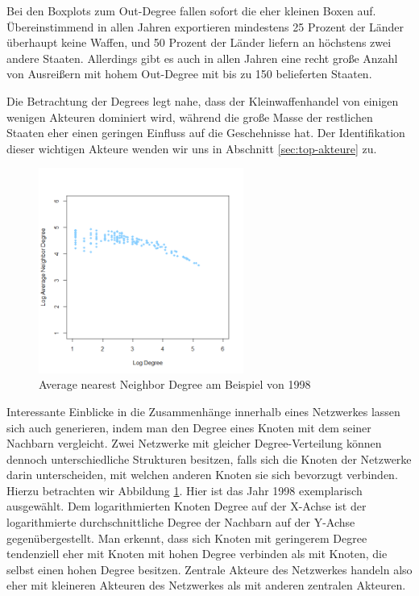 \documentclass[a4paper,ngerman,oneside,titlepage,bibliography=totoc,11pt]{scrreprt}
\begin{document}
Bei den Boxplots zum Out-Degree fallen sofort die eher kleinen Boxen auf. Übereinstimmend in allen Jahren exportieren mindestens 25 Prozent der Länder überhaupt keine Waffen, und 50 Prozent der Länder liefern an höchstens zwei andere Staaten. Allerdings gibt es auch in allen Jahren eine recht große Anzahl von Ausreißern mit hohem Out-Degree mit bis zu 150 belieferten Staaten. 

Die Betrachtung der Degrees legt nahe, dass der Kleinwaffenhandel von einigen wenigen Akteuren dominiert wird, während die große Masse der restlichen Staaten eher einen geringen Einfluss auf die Geschehnisse hat. Der Identifikation dieser wichtigen Akteure wenden wir uns in Abschnitt \ref{sec:top-akteure} zu.


\begin{figure}[htbp]
	\centering
		\includegraphics[width=0.60\textwidth]{Grafiken/and.png}
	\caption{Average nearest Neighbor Degree am Beispiel von 1998}
	\label{fig:and}
\end{figure}

Interessante Einblicke in die Zusammenhänge innerhalb eines Netzwerkes lassen sich auch generieren, indem man den Degree eines Knoten mit dem seiner Nachbarn vergleicht. Zwei Netzwerke mit gleicher Degree-Verteilung können dennoch unterschiedliche Strukturen besitzen, falls sich die Knoten der Netzwerke darin unterscheiden, mit welchen anderen Knoten sie sich bevorzugt verbinden. Hierzu betrachten wir Abbildung \ref{fig:and}. Hier ist das Jahr 1998 exemplarisch ausgewählt. Dem logarithmierten Knoten Degree auf der X-Achse ist der logarithmierte durchschnittliche Degree der Nachbarn auf der Y-Achse gegenübergestellt. Man erkennt, dass sich Knoten mit geringerem Degree tendenziell eher mit Knoten mit hohen Degree verbinden als mit Knoten, die selbst einen hohen Degree besitzen. Zentrale Akteure des Netzwerkes handeln also eher mit kleineren Akteuren des Netzwerkes als mit anderen zentralen Akteuren.
\end{document}
